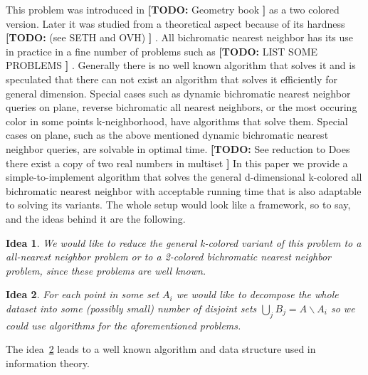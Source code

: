 \documentclass[a4paper,UKenglish,cleveref, autoref, thm-restate]{lipics-v2021}
\newcommand{\nota}[3]{{%
		\color{#2}
		\marginpar{\color{#2!75!black}\textbf\texttimes}%
		\textsf{\textbf{[\textbullet#1:}
			\textsf{\small#3}
			\textbf{\textbullet]}}%
}}
\newcommand{\todo}[1]{\nota{TODO}{red!55!black}{#1}}
\newtheorem{idea}{Idea}
\begin{document}
This problem was introduced in \todo{Geometry book} as a two colored version.
Later it was studied from a theoretical aspect because of its hardness \todo{(see SETH and OVH)}.
All bichromatic nearest neighbor has its use in practice in a fine number of problems such as \todo{LIST SOME PROBLEMS}.
Generally there is no well known algorithm that solves it and is speculated that there can not exist an algorithm that solves it efficiently for general dimension.
Special cases such as dynamic bichromatic nearest neighbor queries on plane, reverse bichromatic all nearest neighbors, or the most occuring color in some points k-neighborhood, have algorithms that solve them.
Special cases on plane, such as the above mentioned dynamic bichromatic nearest neighbor queries, are solvable in optimal time. \todo{See reduction to Does there exist a copy of two real numbers in multiset}
In this paper we provide a simple-to-implement algorithm that solves the general d-dimensional k-colored all bichromatic nearest neighbor with acceptable running time that is also adaptable to solving its variants.
The whole setup would look like a framework, so to say, and the ideas behind it are the following.
\begin{idea} We would like to reduce the general k-colored variant of this problem to a all-nearest neighbor problem or to a 2-colored bichromatic nearest neighbor problem, since these problems are well known.
\end{idea}
\begin{idea}\label{idea:bigcup} For each point in some set $A_i$ we would like to decompose the whole dataset into some (possibly small) number of disjoint sets $\bigcup\limits_j B_j = A \backslash A_i$ so we could use algorithms for the aforementioned problems.
\end{idea}
The idea~\ref{idea:bigcup} leads to a well known algorithm and data structure used in information theory.
\end{document}
